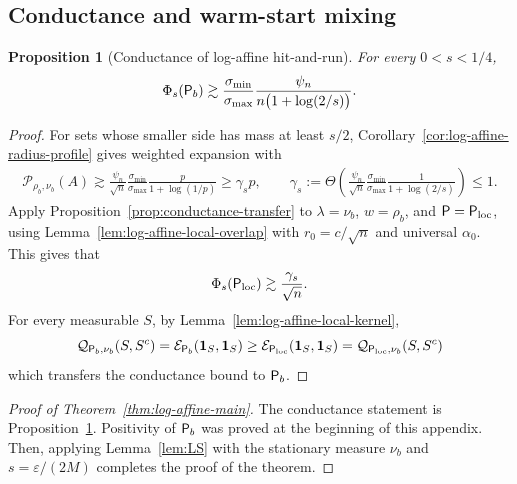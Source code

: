 \documentclass[11pt]{article}
\newtheorem{proposition}[theorem]{Proposition}
\theoremstyle{definition}
\theoremstyle{remark}
\newcommand{\cP}{\mathcal P}
\newcommand{\cQ}{\mathcal Q}
\newcommand{\one}{\mathbf 1}
\begin{document}
\subsection{Conductance and warm-start mixing}
\begin{proposition}[Conductance of log-affine hit-and-run]
\label{prop:log-affine-conductance}
For every $0<s<1/4$,
\begin{equation}\label{eq:log-affine-conductance-proposition}
 \Phi_s({\sf P}_b)
 \gtrsim \frac{\sigma_{\min}}{\sigma_{\max}}
 \frac{\psi_n}{ n\bigl(1+\log(2/s)\bigr)}.
\end{equation}
\end{proposition}

\begin{proof}
For sets whose smaller side has mass at least $s/2$, Corollary~\ref{cor:log-affine-radius-profile} gives weighted expansion with
\begin{align*}
    \cP_{\rho_b,\nu_b}(A)
 \gtrsim \frac{\psi_n}{\sqrt n}
  \frac{\sigma_{\min}}
       {\sigma_{\max}}
 \frac{p}{1+\log(1/p)}\geq \gamma_s p,\qquad \gamma_s:=\Theta\left(\frac{\psi_n}{\sqrt n} \frac{\sigma_{\min}}
       {\sigma_{\max}} \frac{1}{1+\log(2/s)}\right)
 \le1.
\end{align*}
Apply Proposition~\ref{prop:conductance-transfer} to $\lambda=\nu_b$, $w=\rho_b$, and $\mathsf P={\sf P}_{\rm loc}$, using Lemma~\ref{lem:log-affine-local-overlap} with $r_0=c/\sqrt n$ and universal $\alpha_0$.  This gives that 
\begin{align*}
    \Phi_s({\sf P}_{\rm loc})\gtrsim \frac{\gamma_s}{\sqrt{n}}.
\end{align*}
For every measurable $S$, by Lemma~\ref{lem:log-affine-local-kernel},
\[
 \cQ_{{\sf P}_b,\nu_b}(S,S^c)
 =\mathcal E_{{\sf P}_b}(\one_S,\one_S)
 \ge\mathcal E_{{\sf P}_{\rm loc}}(\one_S,\one_S)
 =\cQ_{{\sf P}_{\rm loc},\nu_b}(S,S^c)
\]
which transfers the conductance bound to ${\sf P}_b$.
\end{proof}

\begin{proof}[Proof of Theorem~\ref{thm:log-affine-main}]
The conductance statement is Proposition~\ref{prop:log-affine-conductance}.  Positivity of ${\sf P}_b$ was proved at the beginning of this appendix. Then, applying Lemma~\ref{lem:LS} with the stationary measure  $\nu_b$ and $s=\varepsilon/(2M)$ completes the proof of the theorem.
\end{proof}





\end{document}
